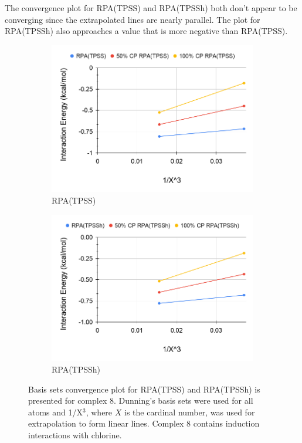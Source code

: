 \documentclass[11pt]{article}
\begin{document}
The convergence plot for RPA(TPSS) and RPA(TPSSh) both don't appear to be
converging since the extrapolated lines are nearly parallel. The plot for
RPA(TPSSh) also approaches a value that is more negative than RPA(TPSS).


\begin{figure}[H]
  \centering
  \begin{subfigure}{.5\textwidth}
    \centering
    \includegraphics[scale=0.3]{tpss-8.png}
    \caption{RPA(TPSS)}
    \label{fig:tpss_8}
  \end{subfigure}%
  \begin{subfigure}{.5\textwidth}
    \centering
    \includegraphics[scale=0.3]{tpssh-8.png}
    \caption{RPA(TPSSh)}
    \label{fig:tpssh_8}
  \end{subfigure}
  \caption{Basis sets convergence plot for RPA(TPSS) and RPA(TPSSh) is
    presented for complex 8. Dunning's basis sets were used for all atoms
    and 1/X$^3$, where $X$ is the cardinal number, was used for extrapolation
    to form linear lines. Complex 8 contains induction interactions with
    chlorine.}
  \label{fig:complex_8}
\end{figure}
\end{document}

